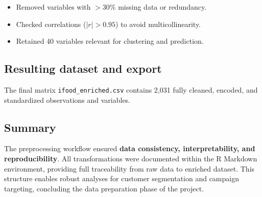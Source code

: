 \begin{itemize}[leftmargin=1.2cm]
    \item Removed variables with $>$30\% missing data or redundancy.
    \item Checked correlations ($|r|>0.95$) to avoid multicollinearity.
    \item Retained 40 variables relevant for clustering and prediction.
\end{itemize}

\subsection{Resulting dataset and export}

The final matrix \texttt{ifood\_enriched.csv} contains 2,031 fully cleaned,
encoded, and standardized observations and variables.

\subsection{Summary}

The preprocessing workflow ensured \textbf{data consistency, interpretability, and reproducibility}.
All transformations were documented within the R Markdown environment,
providing full traceability from raw data to enriched dataset.  
This structure enables robust analyses for customer segmentation and campaign
targeting, concluding the data preparation phase of the project.